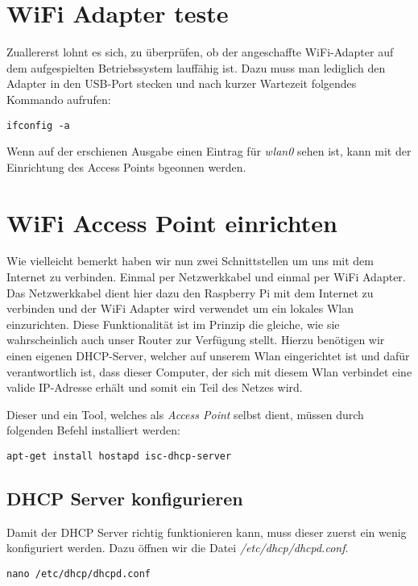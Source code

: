 \section{WiFi Adapter teste}
Zuallererst lohnt es sich, zu überprüfen, ob der angeschaffte WiFi-Adapter auf dem aufgespielten Betriebssystem lauffähig ist. Dazu muss man lediglich den Adapter in den USB-Port stecken und nach kurzer Wartezeit folgendes Kommando aufrufen:

\begin{lstlisting}
ifconfig -a
\end{lstlisting}

Wenn auf der erschienen Ausgabe einen Eintrag für \textit{wlan0} sehen ist, kann mit der Einrichtung des Access Points bgeonnen werden.

\section{WiFi Access Point einrichten}
Wie vielleicht bemerkt haben wir nun zwei Schnittstellen um uns mit dem Internet zu verbinden. Einmal per Netzwerkkabel und einmal per WiFi Adapter.
Das Netzwerkkabel dient hier dazu den Raspberry Pi mit dem Internet zu verbinden und der WiFi Adapter wird verwendet um ein lokales Wlan einzurichten. Diese Funktionalität ist im Prinzip die gleiche, wie sie wahrscheinlich auch unser Router zur Verfügung stellt.
Hierzu benötigen wir einen eigenen DHCP-Server, welcher auf unserem Wlan eingerichtet ist und dafür verantwortlich ist, dass dieser Computer, der sich mit diesem Wlan verbindet eine valide IP-Adresse erhält und somit ein Teil des Netzes wird.

Dieser und ein Tool, welches als \textit{Access Point} selbst dient, müssen durch folgenden Befehl installiert werden:

\begin{lstlisting}
apt-get install hostapd isc-dhcp-server
\end{lstlisting}

\subsection{DHCP Server konfigurieren}
Damit der DHCP Server richtig funktionieren kann, muss dieser zuerst ein wenig konfiguriert werden.
Dazu öffnen wir die Datei \textit{/etc/dhcp/dhcpd.conf}.

\begin{lstlisting}
nano /etc/dhcp/dhcpd.conf
\end{lstlisting}

